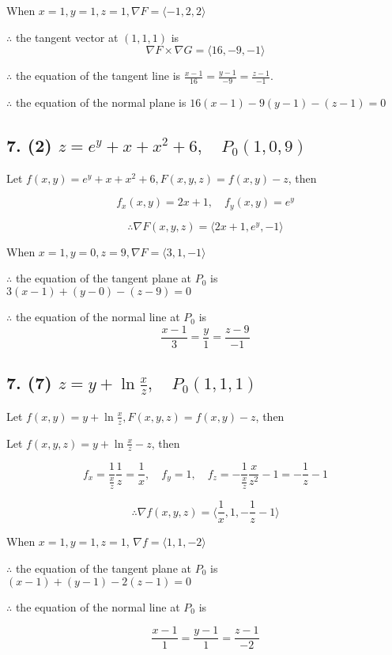 \documentclass{article}
\begin{document}
  When $x = 1, y = 1, z = 1, \nabla F = \langle -1, 2, 2 \rangle$

  $\therefore$ the tangent vector at $(1, 1, 1)$ is $$\nabla F \times \nabla G = \langle 16, -9, -1 \rangle$$

  $\therefore$ the equation of the tangent line is $\frac{x-1}{16} = \frac{y-1}{-9} = \frac{z-1}{-1}$.

  $\therefore$ the equation of the normal plane is $16(x-1) -9(y-1) -(z-1) = 0$

  \subsection*{7. (2) $z = e^y + x + x^2 + 6, \quad P_0(1, 0, 9)$}

  Let $f(x, y) = e^y + x + x^2 + 6, F(x, y, z) = f(x, y) - z$, then

  $$f_x(x, y) = 2x + 1, \quad f_y(x, y) = e^y$$

  $$\therefore \nabla F(x, y, z) = \langle 2x + 1, e^y, -1 \rangle$$

  When $x = 1, y = 0, z = 9, \nabla F = \langle 3, 1, -1 \rangle$

  $\therefore$ the equation of the tangent plane at $P_0$ is $3(x-1)+(y-0)-(z-9)=0$

  $\therefore$ the equation of the normal line at $P_0$ is $$\frac{x-1}{3} = \frac{y}{1} = \frac{z-9}{-1}$$

  \subsection*{7. (7) $z = y + \ln \frac x z, \quad P_0(1, 1, 1)$}

  Let $f(x, y) = y + \ln \frac x z, F(x, y, z) = f(x, y) - z$, then

  Let $f(x, y, z) = y + \ln \frac x z - z$, then

  $$f_x = \frac{1}{\frac x z}\frac{1}{z} = \frac 1 x, \quad f_y = 1, \quad f_z = -\frac{1}{\frac x z}\frac{x}{z^2} - 1 = -\frac{1}{z} - 1$$

  $$\therefore \nabla f(x, y, z) = \langle \frac 1 x, 1, -\frac 1 z - 1 \rangle$$

  When $x = 1, y = 1, z = 1$, $\nabla f = \langle 1, 1, -2 \rangle$

  $\therefore$ the equation of the tangent plane at $P_0$ is $(x - 1) + (y-1) -2(z-1) = 0$

  $\therefore$ the equation of the normal line at $P_0$ is

  $$\frac{x-1}{1} = \frac{y-1}{1} = \frac{z-1}{-2}$$
\end{document}
